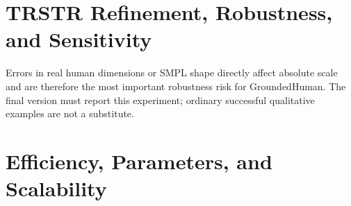 \section{TRSTR Refinement, Robustness, and Sensitivity}
\label{app:robustness}

\begin{table}[H]
\caption{Robustness experiment placeholder. The bins and perturbation ranges define the experimental design and do not represent completed results.}
\label{tab:robustness-placeholder}
\centering
\small
{}
\end{table}

Errors in real human dimensions or SMPL shape directly affect absolute scale and are therefore the most important robustness risk for GroundedHuman. The final version must report this experiment; ordinary successful qualitative examples are not a substitute.

\section{Efficiency, Parameters, and Scalability}
\label{app:efficiency}

